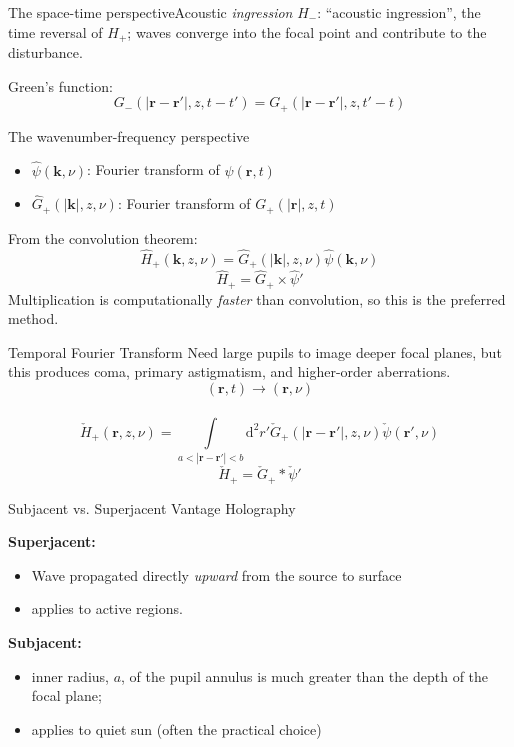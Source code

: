 \documentclass{beamer}
\begin{document}
\begin{frame}{The space-time perspective}{Acoustic \emph{ingression}}
    $H_{-}$: ``acoustic ingression'', the time reversal
    of $H_{+}$; waves converge into the focal point
    and contribute to the disturbance.

    Green's function:
    $$ G_{-}(|\mathbf{r}-\mathbf{r'}|,z,t-t') =
    G_{+}(|\mathbf{r}-\mathbf{r'}|,z,t'-t) $$
\end{frame}
\begin{frame}{The wavenumber-frequency perspective}
    \begin{itemize}
        \item $\hat{\psi}(\mathbf{k},\nu)$: Fourier transform of $\psi(\mathbf{r},t)$
        \item $\hat{G}_{+}(|\mathbf{k}|,z,\nu)$: Fourier transform of
            $G_{+}(|\mathbf{r}|,z,t)$
    \end{itemize}
    From the convolution theorem:
    $$ \hat{H}_{+}(\mathbf{k},z,\nu) = \hat{G}_{+}(|\mathbf{k}|,z,\nu)
     \hat{\psi}(\mathbf{k},\nu) $$
    \textcolor{lemon}{$$ \hat{H}_{+} = \hat{G}_{+} \times \hat{\psi}{'} $$}
     Multiplication is computationally \emph{faster} than convolution,
     so this is the preferred method.
\end{frame}
\begin{frame}{Temporal Fourier Transform}
    Need large pupils to image deeper focal planes,
    but this produces coma, primary astigmatism, and higher-order aberrations.
    $$(\mathbf{r},t) \rightarrow (\mathbf{r},\nu)$$\\
    $$ \check{H}_{+}(\mathbf{r},z,\nu) =
    \int\limits_{a<|\mathbf{r}-\mathbf{r}'|<b}\textrm{d}^{2}r'\check{G}_{+}
        (|\mathbf{r}-\mathbf{r}'|,z,\nu)\check{\psi}(\mathbf{r}',\nu) $$
    \textcolor{lemon}{$$ \check{H}_{+} = \check{G}_{+} * \check{\psi}{'} $$}
\end{frame}
\begin{frame}{Subjacent vs. Superjacent Vantage Holography}

    {\large\textcolor{cblue}{\textbf{Superjacent:}}}
    \begin{itemize}
        \item Wave propagated directly \emph{upward} from the source
            to surface
        \item applies to active regions.
    \end{itemize}
    {\large\textcolor{cblue}{\textbf{Subjacent:}}}
    \begin{itemize}
        \item inner radius, $a$, of the pupil annulus is much greater than
            the depth of the focal plane;
        \item applies to quiet sun (often the practical choice)
    \end{itemize}
\end{frame}
\end{document}
